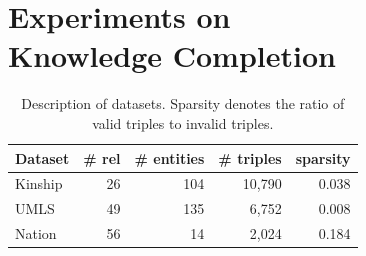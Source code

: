 \section{Experiments on \\ Knowledge Completion}
\label{sec:exp1}

\begin{table}[t]
\centering
\caption{\label{tbl:dataset}Description of datasets.
Sparsity denotes the ratio of valid triples to invalid triples.}
\vskip 0.15in
\begin{tabular}{l | r | r | r | r}
Dataset &  \# rel & \# entities & \# triples & sparsity \\ \hline
Kinship & 26 & 104  & 10,790 & 0.038 \\
UMLS & 49 &135  & 6,752 & 0.008 \\
Nation & 56 & 14  & 2,024 & 0.184 \\
\end{tabular}
\end{table}


